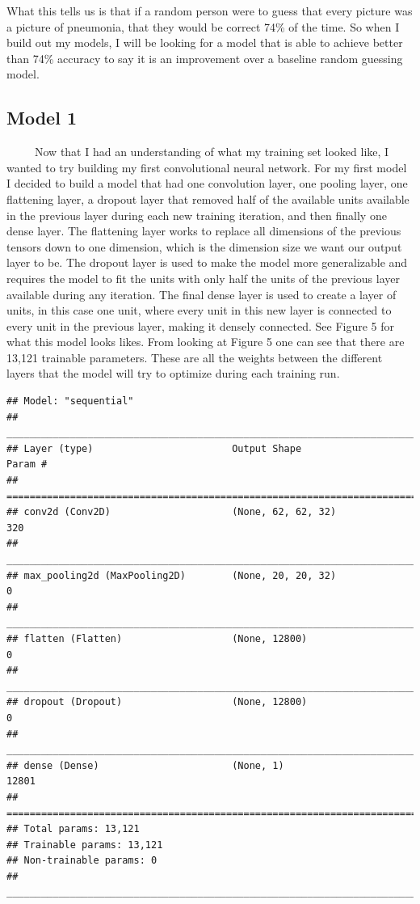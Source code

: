 \documentclass[12pt]{article}
\begin{document}
What this tells us is that if a random person were to guess that every
picture was a picture of pneumonia, that they would be correct 74\% of
the time. So when I build out my models, I will be looking for a model
that is able to achieve better than 74\% accuracy to say it is an
improvement over a baseline random guessing model.

\hypertarget{model-1}{%
\subsection{Model 1}\label{model-1}}

~~~~~Now that I had an understanding of what my training set looked
like, I wanted to try building my first convolutional neural network.
For my first model I decided to build a model that had one convolution
layer, one pooling layer, one flattening layer, a dropout layer that
removed half of the available units available in the previous layer
during each new training iteration, and then finally one dense layer.
The flattening layer works to replace all dimensions of the previous
tensors down to one dimension, which is the dimension size we want our
output layer to be. The dropout layer is used to make the model more
generalizable and requires the model to fit the units with only half the
units of the previous layer available during any iteration. The final
dense layer is used to create a layer of units, in this case one unit,
where every unit in this new layer is connected to every unit in the
previous layer, making it densely connected. See Figure 5 for what this
model looks likes. From looking at Figure 5 one can see that there are
13,121 trainable parameters. These are all the weights between the
different layers that the model will try to optimize during each
training run.

\begin{verbatim}
## Model: "sequential"
## ________________________________________________________________________________
## Layer (type)                        Output Shape                    Param #     
## ================================================================================
## conv2d (Conv2D)                     (None, 62, 62, 32)              320         
## ________________________________________________________________________________
## max_pooling2d (MaxPooling2D)        (None, 20, 20, 32)              0           
## ________________________________________________________________________________
## flatten (Flatten)                   (None, 12800)                   0           
## ________________________________________________________________________________
## dropout (Dropout)                   (None, 12800)                   0           
## ________________________________________________________________________________
## dense (Dense)                       (None, 1)                       12801       
## ================================================================================
## Total params: 13,121
## Trainable params: 13,121
## Non-trainable params: 0
## ________________________________________________________________________________
\end{verbatim}
\end{document}
